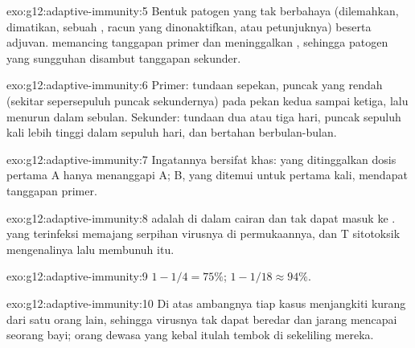 \begin{solution}{exo:g12:adaptive-immunity:5}
Bentuk  patogen yang tak berbahaya (dilemahkan, dimatikan,
sebuah , racun yang dinonaktifkan, atau petunjuknya) beserta
adjuvan.  memancing tanggapan primer dan meninggalkan , sehingga patogen yang sungguhan disambut tanggapan sekunder.
\end{solution}

\begin{solution}{exo:g12:adaptive-immunity:6}
Primer: tundaan sepekan, puncak yang rendah (sekitar sepersepuluh
puncak sekundernya) pada pekan kedua sampai ketiga, lalu menurun dalam
sebulan. Sekunder: tundaan dua atau tiga hari, puncak sepuluh kali
lebih tinggi dalam sepuluh hari, dan bertahan berbulan-bulan.
\end{solution}

\begin{solution}{exo:g12:adaptive-immunity:7}
Ingatannya bersifat khas:  yang ditinggalkan dosis pertama A
hanya menanggapi A; B, yang ditemui untuk pertama kali, mendapat
tanggapan primer.
\end{solution}

\begin{solution}{exo:g12:adaptive-immunity:8}
 adalah  di dalam cairan dan tak dapat masuk ke . 
yang terinfeksi memajang serpihan virusnya di permukaannya, dan  T
sitotoksik mengenalinya lalu membunuh  itu.
\end{solution}

\begin{solution}{exo:g12:adaptive-immunity:9}
$1 - 1/4 = 75\%$; $1 - 1/18 \approx 94\%$.
\end{solution}

\begin{solution}{exo:g12:adaptive-immunity:10}
Di atas ambangnya tiap kasus menjangkiti kurang dari satu orang lain,
sehingga virusnya tak dapat beredar dan jarang mencapai seorang bayi;
orang dewasa yang kebal itulah tembok di sekeliling mereka.
\end{solution}

